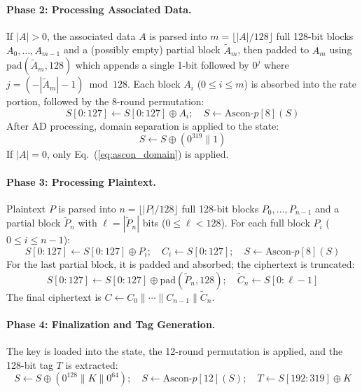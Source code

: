 \documentclass[11pt,a4paper]{article}
\newcommand{\xor}{\oplus}
\newcommand{\concat}{\mathbin{\|}}
\begin{document}
\paragraph{Phase 2: Processing Associated Data.}
If $|A| > 0$, the associated data $A$ is parsed into $m = \lfloor |A|/128 \rfloor$ full 128-bit blocks $A_0,\ldots,A_{m-1}$ and a (possibly empty) partial block $\tilde{A}_m$, then padded to $A_m$ using $\text{pad}(\tilde{A}_m, 128)$ which appends a single 1-bit followed by $0^j$ where $j = (-|\tilde{A}_m|-1) \bmod 128$. Each block $A_i$ ($0 \leq i \leq m$) is absorbed into the rate portion, followed by the 8-round permutation:
\begin{equation}
S[0\!:\!127] \leftarrow S[0\!:\!127] \xor A_i; \quad S \leftarrow \text{Ascon-}p[8](S)
\label{eq:ascon_ad}
\end{equation}
After AD processing, domain separation is applied to the state:
\begin{equation}
S \leftarrow S \xor (0^{319} \concat 1)
\label{eq:ascon_domain}
\end{equation}
If $|A| = 0$, only Eq.~(\ref{eq:ascon_domain}) is applied.

\paragraph{Phase 3: Processing Plaintext.}
Plaintext $P$ is parsed into $n = \lfloor |P|/128 \rfloor$ full 128-bit blocks $P_0,\ldots,P_{n-1}$ and a partial block $\tilde{P}_n$ with $\ell = |\tilde{P}_n|$ bits ($0 \leq \ell < 128$). For each full block $P_i$ ($0 \leq i \leq n-1$):
\begin{equation}
S[0\!:\!127] \leftarrow S[0\!:\!127] \xor P_i; \quad C_i \leftarrow S[0\!:\!127]; \quad S \leftarrow \text{Ascon-}p[8](S)
\label{eq:ascon_pt_full}
\end{equation}
For the last partial block, it is padded and absorbed; the ciphertext is truncated:
\begin{equation}
S[0\!:\!127] \leftarrow S[0\!:\!127] \xor \text{pad}(\tilde{P}_n, 128); \quad \tilde{C}_n \leftarrow S[0\!:\!\ell-1]
\label{eq:ascon_pt_partial}
\end{equation}
The final ciphertext is $C \leftarrow C_0 \concat \cdots \concat C_{n-1} \concat \tilde{C}_n$.

\paragraph{Phase 4: Finalization and Tag Generation.}
The key is loaded into the state, the 12-round permutation is applied, and the 128-bit tag $T$ is extracted:
\begin{equation}
S \leftarrow S \xor (0^{128} \concat K \concat 0^{64}); \quad S \leftarrow \text{Ascon-}p[12](S); \quad T \leftarrow S[192\!:\!319] \xor K
\label{eq:ascon_final}
\end{equation}
\end{document}
